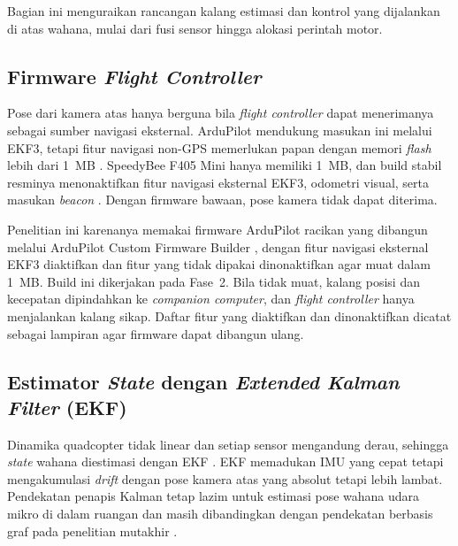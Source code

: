 \documentclass[12pt,a4paper]{report}
\begin{document}
Bagian ini menguraikan rancangan kalang estimasi dan kontrol yang dijalankan di atas wahana, mulai dari fusi sensor hingga alokasi perintah motor.

\subsection{Firmware \textit{Flight Controller}}
\label{subsec:firmware_fc}

Pose dari kamera atas hanya berguna bila \textit{flight controller} dapat menerimanya sebagai sumber navigasi eksternal. ArduPilot mendukung masukan ini melalui EKF3, tetapi fitur navigasi non-GPS memerlukan papan dengan memori \textit{flash} lebih dari 1~MB \cite{ardupilotNonGPSPositionEstimation}. SpeedyBee F405 Mini hanya memiliki 1~MB, dan build stabil resminya menonaktifkan fitur navigasi eksternal EKF3, odometri visual, serta masukan \textit{beacon} \cite{ardupilotFeaturesSpeedyBeeF405Mini}. Dengan firmware bawaan, pose kamera tidak dapat diterima.

Penelitian ini karenanya memakai firmware ArduPilot racikan yang dibangun melalui ArduPilot Custom Firmware Builder \cite{ardupilotCustomFirmwareBuilder}, dengan fitur navigasi eksternal EKF3 diaktifkan dan fitur yang tidak dipakai dinonaktifkan agar muat dalam 1~MB. Build ini dikerjakan pada Fase~2. Bila tidak muat, kalang posisi dan kecepatan dipindahkan ke \textit{companion computer}, dan \textit{flight controller} hanya menjalankan kalang sikap. Daftar fitur yang diaktifkan dan dinonaktifkan dicatat sebagai lampiran agar firmware dapat dibangun ulang.

\subsection{Estimator \textit{State} dengan \textit{Extended Kalman Filter} (EKF)}

Dinamika quadcopter tidak linear dan setiap sensor mengandung derau, sehingga \textit{state} wahana diestimasi dengan EKF \cite{KalmanFilterGeneralizations2006}. EKF memadukan IMU yang cepat tetapi mengakumulasi \textit{drift} dengan pose kamera atas yang absolut tetapi lebih lambat. Pendekatan penapis Kalman tetap lazim untuk estimasi pose wahana udara mikro di dalam ruangan dan masih dibandingkan dengan pendekatan berbasis graf pada penelitian mutakhir \cite{kabiriGraphBasedErrorState2024}.
\end{document}
